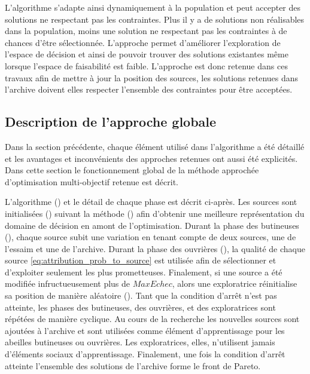 L’algorithme s’adapte ainsi dynamiquement à la population et peut accepter des
solutions ne respectant pas les contraintes. Plus il y a de solutions non
réalisables dans la population, moins une solution ne respectant pas les contraintes à
de chances d’être sélectionnée. L’approche permet d’améliorer l’exploration de
l’espace de décision et ainsi de pouvoir trouver des solutions existantes même
lorsque l’espace de faisabilité est faible.
L’approche est donc retenue dans ces travaux afin de mettre à jour la position des
sources, les solutions retenues dans l’archive doivent elles respecter
l’ensemble des contraintes pour être acceptées.


\subsection{Description de l’approche globale} %
\label{sub:description_de_l_approche_globale}
Dans la section précédente, chaque élément utilisé dans l’algorithme a été détaillé et
les avantages et inconvénients des approches retenues ont aussi été explicités.
Dans cette section le fonctionnement global de la méthode approchée d’optimisation
multi-objectif retenue est décrit.

L’algorithme () et le détail de chaque phase est décrit ci-après.
Les sources sont initialisées () suivant la méthode
 () afin d’obtenir une meilleure représentation du
domaine de décision en amont de l’optimisation.
Durant la phase des butineuses (), chaque source
subit une variation en tenant compte de deux sources, une de l’essaim et une de l’archive.
Durant la phase des ouvrières (), la qualité de
chaque source \eqref{eq:attribution_prob_to_source} est utilisée afin de sélectionner
et d’exploiter seulement les plus prometteuses. Finalement, si une source a été
modifiée infructueusement plus de $MaxEchec$, alors une exploratrice
réinitialise sa position de manière aléatoire  ().
Tant que la condition d’arrêt n’est pas atteinte, les phases des butineuses,
des ouvrières, et des exploratrices sont répétées de manière cyclique. Au cours de
la recherche les nouvelles sources sont ajoutées à l’archive et sont utilisées
comme élément d’apprentissage pour les abeilles butineuses ou ouvrières. Les
exploratrices, elles, n’utilisent jamais d’éléments sociaux d’apprentissage.
Finalement, une fois la condition d’arrêt atteinte l’ensemble des solutions
de l’archive forme le front de Pareto.

